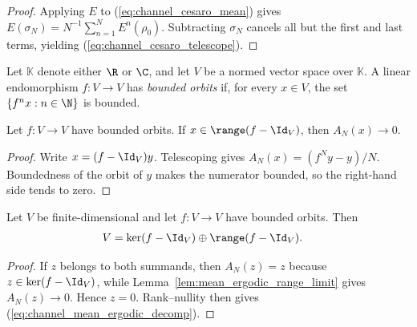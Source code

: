 \begin{proof}\leanok{}
    Applying $E$ to (\ref{eq:channel_cesaro_mean}) gives
    $E(\sigma_N)=N^{-1}\sum_{n=1}^{N}E^n(\rho_0)$.
    Subtracting $\sigma_N$ cancels all but the first and last terms, yielding
    (\ref{eq:channel_cesaro_telescope}).
\end{proof}

\begin{definition}
    \label{def:has_bounded_orbits}
    \leanok
    Let $\mathbb K$ denote either $\R$ or $\C$, and let $V$ be a normed
    vector space over $\mathbb K$. A linear endomorphism $f:V\to V$ has
    \emph{bounded orbits} if, for every $x\in V$, the set
    $\{f^n x:n\in\N\}$ is bounded.
\end{definition}

\begin{lemma}
    \label{lem:mean_ergodic_range_limit}
    \leanok
    Let $f:V\to V$ have bounded orbits. If
    $x\in\range(f-\Id_V)$, then $A_N(x)\longrightarrow 0$.
\end{lemma}

\begin{proof}\leanok
    Write $x=(f-\Id_V)y$. Telescoping gives
    $A_N(x)=(f^Ny-y)/N$. Boundedness of the orbit of $y$ makes the
    numerator bounded, so the right-hand side tends to zero.
\end{proof}

\begin{lemma}
    \label{lem:mean_ergodic_complementarity}
    \leanok
    Let $V$ be finite-dimensional and let $f:V\to V$ have bounded orbits.
    Then
    \begin{align}
        V
         & =\ker(f-\Id_V)\oplus\range(f-\Id_V).
        \label{eq:channel_mean_ergodic_decomp}
    \end{align}
\end{lemma}

\begin{proof}\leanok
    If $z$ belongs to both summands, then $A_N(z)=z$ because
    $z\in\ker(f-\Id_V)$, while Lemma~\ref{lem:mean_ergodic_range_limit} gives
    $A_N(z)\to0$. Hence $z=0$. Rank--nullity then gives
    (\ref{eq:channel_mean_ergodic_decomp}).
\end{proof}

